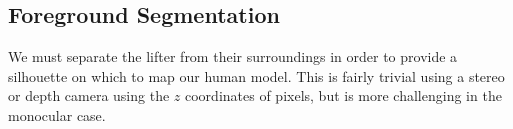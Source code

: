 \subsection{Foreground Segmentation}

We must separate the lifter from their surroundings in order to provide a silhouette on which to map our human model. This is fairly trivial using a stereo or depth camera using the $z$ coordinates of pixels, but is more challenging in the monocular case.



